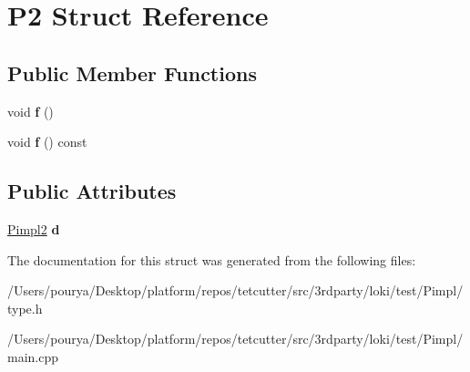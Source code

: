 \hypertarget{structP2}{}\section{P2 Struct Reference}
\label{structP2}
\subsection*{Public Member Functions}
\begin{DoxyCompactItemize}
\item 
\hypertarget{structP2_aa1317791eb826edb88e1afa2b6ab8aa8}{}void {\bfseries f} ()\label{structP2_aa1317791eb826edb88e1afa2b6ab8aa8}

\item 
\hypertarget{structP2_a47e723ced6ecc520f172d80e4ddfec7a}{}void {\bfseries f} () const \label{structP2_a47e723ced6ecc520f172d80e4ddfec7a}

\end{DoxyCompactItemize}
\subsection*{Public Attributes}
\begin{DoxyCompactItemize}
\item 
\hypertarget{structP2_af049bb7b42c794b5fe5c3ce54988dd93}{}\hyperlink{classLoki_1_1Pimpl}{Pimpl2} {\bfseries d}\label{structP2_af049bb7b42c794b5fe5c3ce54988dd93}

\end{DoxyCompactItemize}


The documentation for this struct was generated from the following files\+:\begin{DoxyCompactItemize}
\item 
/\+Users/pourya/\+Desktop/platform/repos/tetcutter/src/3rdparty/loki/test/\+Pimpl/type.\+h\item 
/\+Users/pourya/\+Desktop/platform/repos/tetcutter/src/3rdparty/loki/test/\+Pimpl/main.\+cpp\end{DoxyCompactItemize}
